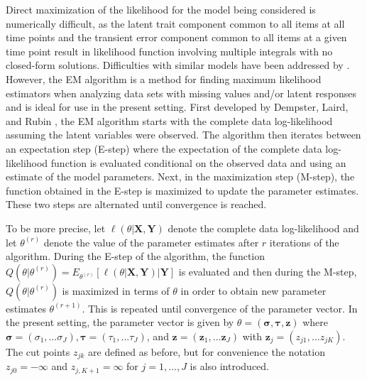 \documentclass[12pt]{article}
\begin{document}
Direct maximization of the likelihood for the model being considered is numerically difficult, as the latent trait component common to all items at all time points and the transient error component common to all items at a given time point result in likelihood function involving multiple
integrals with no closed-form solutions. Difficulties with similar models have been addressed by \cite{Nielsen00}. However, the EM algorithm is a method for
finding maximum likelihood estimators when analyzing data sets with missing
values and/or latent responses and is ideal for use in the present setting.
First developed by Dempster, Laird, and Rubin \cite{Dempster77}, the EM
algorithm starts with the complete data log-likelihood assuming the latent
variables were observed. The algorithm then iterates between an expectation
step (E-step) where the expectation of the complete data log-likelihood function is evaluated conditional on the observed data and using an estimate of the model parameters. Next, in the maximization step (M-step), the function
obtained in the E-step is maximized to update the parameter estimates. These
two steps are alternated until convergence is reached.

To be more precise, let $\ell (\theta | \mathbf{X},\mathbf{Y})$ denote the complete data log-likelihood and let $\theta^{(r)}$ denote the value of the
parameter estimates after $r$ iterations of the algorithm. During the E-step
of the algorithm, the function $Q(\theta \big| \theta^{(r)}) =
E_{\theta^{(r)}}[\ell (\theta | \mathbf{X},\mathbf{Y}) \big|\mathbf{Y}]$ is evaluated and then during the M-step, $Q(\theta \big| \theta^{(r)})$ is
maximized in terms of $\theta$ in order to obtain new parameter
estimates $\theta^{(r+1)}$. This is repeated until convergence of the
parameter vector. In the present setting, the parameter vector is given by $%
\theta = (\boldsymbol{\sigma},\boldsymbol{\tau},\mathbf{z})$ where $%
\boldsymbol{\sigma} = ( \sigma_1, ... \sigma_J), \boldsymbol{\tau} = (
\tau_1, ... \tau_J)$, and $\mathbf{z} = ( \mathbf{z}_1, ... \mathbf{z}_J)$
with $\mathbf{z}_j = (z_{j1}, ... z_{jK})$. The cut points $z_{jk}$ are
defined as before, but for convenience the notation $z_{j0}=-\infty
$ and $z_{j,K+1}=\infty$ for $j=1,\ldots,J$ is also introduced.
\end{document}
